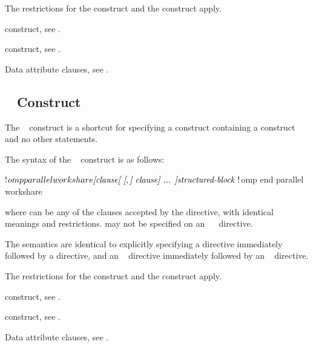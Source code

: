 \restrictions
The restrictions for the  construct and the  
construct apply.

\begin{crossrefs}
\item {} construct, see
.

\item {} construct, see
.

\item Data attribute clauses, see
.
\end{crossrefs}



\begin{fortranspecific}
\subsection{~ Construct}
\label{subsec:parallel workshare Construct}

\summary
The ~ construct is a shortcut for specifying a 
 construct containing a  construct and no 
other statements.

\syntax
The syntax of the ~ construct is as follows:

\begin{ompfPragma}
!$omp parallel workshare \plc{[clause[ [},\plc{] clause] ... ]}
   \plc{structured-block }
!$omp end parallel workshare
\end{ompfPragma}

where  can be any of the clauses accepted by the  
directive, with identical meanings and restrictions.  may not be 
specified on an ~~ directive.

\descr
The semantics are identical to explicitly specifying a  directive 
immediately followed by a  directive, and an 
~ directive immediately followed by an 
~ directive.

\restrictions
The restrictions for the  construct and the  
construct apply.

\begin{crossrefs}
\item {} construct, see
.

\item {} construct, see
.

\item Data attribute clauses, see
.
\end{crossrefs}
\end{fortranspecific}



